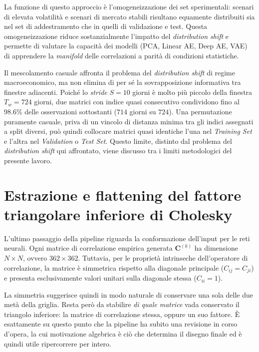 La funzione di questo approccio è l'omogeneizzazione dei set sperimentali: scenari di elevata volatilità e scenari di mercato stabili risultano equamente distribuiti sia nel set di addestramento che in quelli di validazione e test. Questa omogeneizzazione riduce sostanzialmente l'impatto del \emph{distribution shift} e permette di valutare la capacità dei modelli (PCA, Linear AE, Deep AE, VAE) di apprendere la \emph{manifold} delle correlazioni a parità di condizioni statistiche.

\begin{osservazione}
Il mescolamento casuale affronta il problema del \emph{distribution shift} di regime macroeconomico, ma non elimina di per sé la sovrapposizione informativa tra finestre adiacenti. Poiché lo \emph{stride} $S=10$ giorni è molto più piccolo della finestra $T_w=724$ giorni, due matrici con indice quasi consecutivo condividono fino al $98.6\%$ delle osservazioni sottostanti ($714$ giorni su $724$). Una permutazione puramente casuale, priva di un vincolo di distanza minima tra gli indici assegnati a split diversi, può quindi collocare matrici quasi identiche l'una nel \emph{Training Set} e l'altra nel \emph{Validation} o \emph{Test Set}. Questo limite, distinto dal problema del \emph{distribution shift} qui affrontato, viene discusso tra i limiti metodologici del presente lavoro.
\end{osservazione}

\section{Estrazione e flattening del fattore triangolare inferiore di Cholesky}
\label{sec:flattening}

L'ultimo passaggio della pipeline riguarda la conformazione dell'input per le reti neurali. Ogni matrice di correlazione empirica generata $\mathbf{C}^{(k)}$ ha dimensione $N \times N$, ovvero $362 \times 362$. Tuttavia, per le proprietà intrinseche dell'operatore di correlazione, la matrice è simmetrica rispetto alla diagonale principale ($C_{ij} = C_{ji}$) e presenta esclusivamente valori unitari sulla diagonale stessa ($C_{ii} = 1$).

La simmetria suggerisce quindi in modo naturale di conservare una sola delle due metà della griglia. Resta però da stabilire \emph{di quale matrice} vada conservato il triangolo inferiore: la matrice di correlazione stessa, oppure un suo fattore. È esattamente su questo punto che la pipeline ha subito una revisione in corso d'opera, la cui motivazione algebrica è ciò che determina il disegno finale ed è quindi utile ripercorrere per intero.

